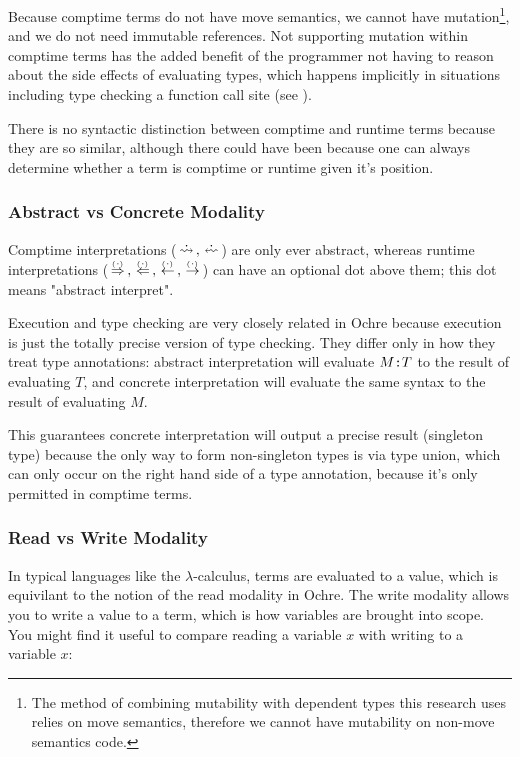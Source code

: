 \documentclass[12pt,twoside]{report}
\begin{document}
Because comptime terms do not have move semantics, we cannot have mutation\footnote{The method of combining mutability with dependent types this research uses relies on move semantics, therefore we cannot have mutability on non-move semantics code.}, and we do not need immutable references. Not supporting mutation within comptime terms has the added benefit of the programmer not having to reason about the side effects of evaluating types, which happens implicitly in situations including type checking a function call site (see ).
 
There is no syntactic distinction between comptime and runtime terms because they are so similar, although there could have been because one can always determine whether a term is comptime or runtime given it's position.

\subsubsection{Abstract vs Concrete Modality}
Comptime interpretations ($\erasedreadarrow, \erasedwritearrow$) are only ever abstract, whereas runtime interpretations ($\,\stackrel{_(._)}{\Rightarrow}\,, \,\stackrel{_(._)}{\Leftarrow}\,, \,\stackrel{_(._)}{\leftarrow}\,, \,\stackrel{_(._)}{\rightarrow}\,$) can have an optional dot above them; this dot means "abstract interpret".

Execution and type checking are very closely related in Ochre because execution is just the totally precise version of type checking. They differ only in how they treat type annotations: abstract interpretation will evaluate $M \text{\texttt{:}} T$ to the result of evaluating $T$, and concrete interpretation will evaluate the same syntax to the result of evaluating $M$.

This guarantees concrete interpretation will output a precise result (singleton type) because the only way to form non-singleton types is via type union, which can only occur on the right hand side of a type annotation, because it's only permitted in comptime terms.

\subsubsection{Read vs Write Modality}
In typical languages like the $\lambda$-calculus, terms are evaluated to a value, which is equivilant to the notion of the read modality in Ochre. The write modality allows you to write a value to a term, which is how variables are brought into scope. You might find it useful to compare reading a variable $x$ with writing to a variable $x$:
\end{document}
